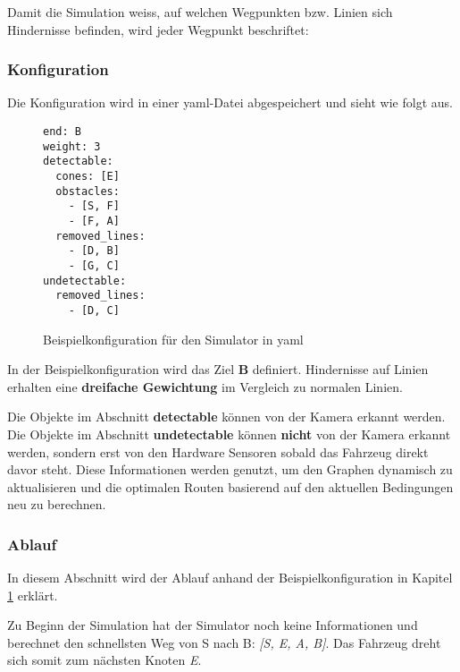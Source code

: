 \documentclass[../main.tex]{subfiles}
\begin{document}
Damit die Simulation weiss, auf welchen Wegpunkten bzw. Linien sich Hindernisse befinden, wird jeder Wegpunkt beschriftet:


\subsubsection{Konfiguration} \label{sim:Konfiguration}

Die Konfiguration wird in einer \acrshort{yaml}-Datei abgespeichert und sieht wie folgt aus.
\begin{figure}[H]
    \centering
\begin{verbatim}
end: B
weight: 3
detectable:
  cones: [E]
  obstacles: 
    - [S, F]
    - [F, A]
  removed_lines:
    - [D, B]
    - [G, C]
undetectable:
  removed_lines:
    - [D, C]
\end{verbatim}
    \label{fig:Beispielkonfiguration}
    \caption{Beispielkonfiguration für den Simulator in yaml}
\end{figure}

In der Beispielkonfiguration wird das Ziel \textbf{B} definiert. Hindernisse auf Linien erhalten eine \textbf{dreifache Gewichtung} im Vergleich zu normalen Linien.

Die Objekte im Abschnitt \textbf{detectable} können von der Kamera erkannt werden.
Die Objekte im Abschnitt \textbf{undetectable} können \textbf{nicht} von der Kamera erkannt werden, sondern erst von den Hardware Sensoren sobald das Fahrzeug direkt davor steht.
Diese Informationen werden genutzt, um den Graphen dynamisch zu aktualisieren und die optimalen Routen basierend auf den aktuellen Bedingungen neu zu berechnen.

\subsubsection{Ablauf}

In diesem Abschnitt wird der Ablauf anhand der Beispielkonfiguration in Kapitel \ref{fig:Beispielkonfiguration} erklärt.

Zu Beginn der Simulation hat der Simulator noch keine Informationen und berechnet den schnellsten Weg von S nach B: \textit{[S, E, A, B]}. Das Fahrzeug dreht sich somit zum nächsten Knoten \textit{E}.

\end{document}
